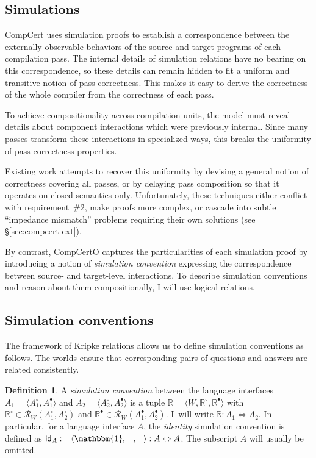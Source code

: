 \documentclass[11pt,oneside]{book}
\theoremstyle{definition}
\newtheorem{definition}[theorem]{Definition}
\newcommand{\kw}[1]{\ensuremath{ \mathsf{#1} }}
\newcommand{\que}{\circ}         %
\newcommand{\ans}{\bullet}       %
\begin{document}

\subsection{Simulations} %

CompCert uses simulation proofs
to establish a correspondence between
the externally observable behaviors of
the source and target programs of each compilation pass.
The internal details of simulation relations
have no bearing on this correspondence,
so these details can remain hidden
to fit a uniform and transitive notion of pass correctness.
This makes it easy to derive the correctness
of the whole compiler
from the correctness of each pass.

To achieve compositionality across compilation units,
the model must reveal details
about component interactions
which were previously internal.
Since many passes transform
these interactions in
specialized ways,
this breaks the uniformity
of pass correctness properties.

Existing work attempts to recover this uniformity
by devising a general notion of correctness
covering all passes,
or by delaying pass composition so that
it operates on closed semantics only.
Unfortunately, these techniques either
conflict with requirement~\#2,
make proofs more complex,
or cascade into subtle ``impedance mismatch'' problems
requiring their own solutions
(see \S\ref{sec:compcert-ext}).

By contrast,
CompCertO captures the particularities of each simulation proof
by introducing a notion of \emph{simulation convention}
expressing the correspondence between
source- and target-level interactions.
To describe simulation conventions
and reason about them
compositionally,
I will use logical relations.


\subsection{Simulation conventions} \label{sec:simconv} %

The framework of Kripke relations allows us
to define simulation conventions as follows.
The worlds ensure that corresponding pairs of
questions and answers are related consistently.

\begin{definition} \label{def:simconv} %
A \emph{simulation convention} between the language interfaces
$A_1 = \langle A_1^\que, A_1^\ans \rangle$ and
$A_2 = \langle A_2^\que, A_2^\ans \rangle$
is a tuple $\mathbb{R} = \langle W, \mathbb{R}^\que, \mathbb{R}^\ans \rangle$
with $\mathbb{R}^\que \in \mathcal{R}_W(A_1^\que, A_2^\que)$
and $\mathbb{R}^\ans \in \mathcal{R}_W(A_1^\ans, A_2^\ans)$.
I~will write $\mathbb{R} : A_1 \Leftrightarrow A_2$.
In particular,
for a language interface $A$,
the \emph{identity} simulation convention
is defined as
$\kw{id}_A := \langle \mathbbm{1}, {=}, {=} \rangle
  : A \Leftrightarrow A$.
The subscript $A$ will usually be omitted.
\end{definition}
\end{document}
